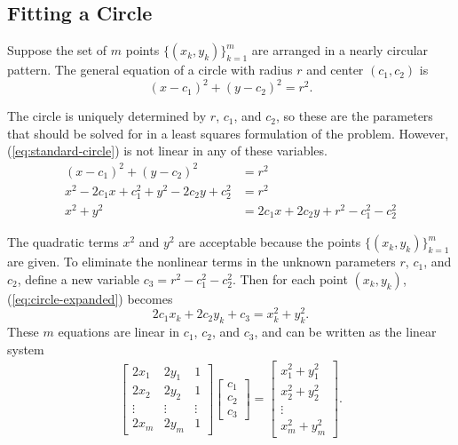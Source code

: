 \subsection*{Fitting a Circle} %

Suppose the set of $m$ points $\{(x_k, y_k)\}_{k=1}^m$ are arranged in a nearly circular pattern.
The general equation of a circle with radius $r$ and center $(c_1, c_2)$ is
\begin{equation}
(x-c_1)^2 + (y-c_2)^2 = r^2.
\label{eq:standard-circle}
\end{equation}

The circle is uniquely determined  by $r$, $c_1$, and $c_2$, so these are the parameters that should be solved for in a least squares formulation of the problem.
However, (\ref{eq:standard-circle}) is not linear in any of these variables.
%
\begin{align}
\nonumber (x - c_1)^2 + (y - c_2)^2 &= r^2 \\
\nonumber x^2 - 2c_1 x + c_1^2 + y^2 - 2c_2y + c_2^2 &= r^2 \\
x^2 + y^2 & = 2c_1 x + 2c_2 y + r^2 - c_1^2 - c_2^2
\label{eq:circle-expanded}
\end{align}

The quadratic terms $x^2$ and $y^2$ are acceptable because the points $\{(x_k, y_k)\}_{k=1}^m$ are given.
To eliminate the nonlinear terms in the unknown parameters $r$, $c_1$, and $c_2$, define a new variable $c_3 = r^2 - c_1^2 - c_2^2$.
Then for each point $(x_k, y_k)$, (\ref{eq:circle-expanded}) becomes
\[2c_1x_k + 2c_2y_k + c_3 = x_k^2 + y_k^2.\]
These $m$ equations are linear in $c_1$, $c_2$, and $c_3$, and can be written as the linear system
\begin{align}
\left[\begin{array}{ccc}
2 x_1 & 2 y_1 & 1 \\
2 x_2 & 2 y_2 & 1 \\
\vdots & \vdots & \vdots \\
2 x_m & 2 y_m & 1
\end{array}\right]
\left[\begin{array}{c} c_1 \\ c_2 \\ c_3 \end{array}\right]
=
\left[\begin{array}{c}
x_1^2 + y_1^2 \\
x_2^2 + y_2^2 \\
\vdots \\
x_m^2 + y_m^2
\end{array}\right].
\label{eq:circle-least-squares}
\end{align}

